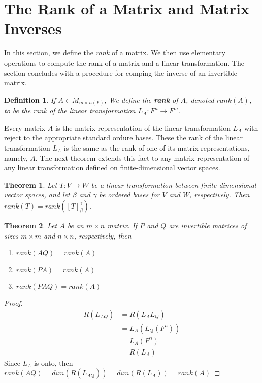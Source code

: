 \documentclass[10pt, oneside]{article}
\newtheorem{thm}{Theorem}
\newtheorem{defn}{Definition}
\begin{document}
\section{The Rank of a Matrix and Matrix Inverses}

In this section, we define the \textit{rank} of a matrix. We then use elementary operations to compute the rank of a matrix and a linear transformation. The section concludes with
a procedure for comping the inverse of an invertible matrix.

\begin{defn}
	If $A \in M_{m \times n(F)}$, We define the \textbf{rank} of $A$, denoted $rank(A)$, to be the rank of the linear transformation $L_A: F^n \to F^m$.
\end{defn}

Every matrix $A$ is the matrix representation of the linear transformation $L_A$ with reject to the appropriate standard ordure bases. These the rank of the linear transformation $L_A$
is the same as the rank of one of its matrix representations, namely, $A$. The next theorem extends this fact to any matrix representation of any linear transformation defined on finite-dimensional
vector spaces.

\begin{thm}
	Let $T:V \to W$ be a linear transformation between finite dimensional vector spaces, and let $\beta$ and $\gamma$ be ordered bases for $V$ and $W$, respectively.
	Then $rank(T) = rank([T]_{\beta}^{\gamma})$.
\end{thm}

\begin{thm}
	Let $A$ be an $m \times n$ matrix. If $P$ and $Q$ are invertible matrices of sizes $m \times m$ and $n \times n$, respectively, then
	\begin{enumerate}
		\item $rank(AQ) = rank(A)$
		\item $rank(PA) = rank(A)$
		\item $rank(PAQ) = rank(A)$
	\end{enumerate}
\end{thm}

\begin{proof}
	\begin{align*}
		R(L_{AQ}) & = R(L_A L_Q)    \\
		          & = L_A(L_Q(F^n)) \\
		          & = L_A(F^n)      \\
		          & = R(L_A)
	\end{align*}
	Since $L_A$ is onto, then $rank(AQ) = dim(R(L_{AQ})) = dim(R(L_A)) = rank(A)$
\end{proof}
\end{document}
